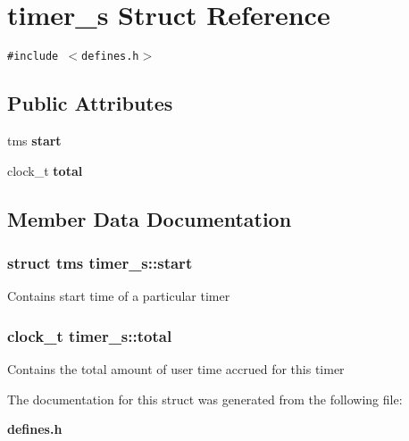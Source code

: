 \section{timer\_\-s Struct Reference}
\label{structtimer__s}
{\tt \#include $<$defines.h$>$}

\subsection*{Public Attributes}
\begin{CompactItemize}
\item 
tms {\bf start}
\item 
clock\_\-t {\bf total}
\end{CompactItemize}


\subsection{Member Data Documentation}
\subsubsection{\setlength{\rightskip}{0pt plus 5cm}struct tms {\bf timer\_\-s::start}}\label{structtimer__s_o0}


Contains start time of a particular timer 
\subsubsection{\setlength{\rightskip}{0pt plus 5cm}clock\_\-t {\bf timer\_\-s::total}}\label{structtimer__s_o1}


Contains the total amount of user time accrued for this timer 

The documentation for this struct was generated from the following file:\begin{CompactItemize}
\item 
{\bf defines.h}\end{CompactItemize}
